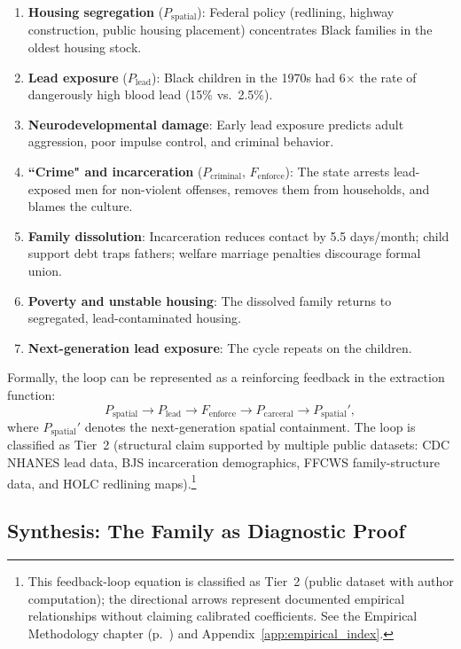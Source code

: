 \begin{enumerate}
  \item \textbf{Housing segregation} ($P_{\text{spatial}}$): Federal policy (redlining, highway construction, public housing placement) concentrates Black families in the oldest housing stock.
  \item \textbf{Lead exposure} ($P_{\text{lead}}$): Black children in the 1970s had 6$\times$ the rate of dangerously high blood lead (15\% vs.~2.5\%).
  \item \textbf{Neurodevelopmental damage}: Early lead exposure predicts adult aggression, poor impulse control, and criminal behavior.
  \item \textbf{``Crime" and incarceration} ($P_{\text{criminal}}$, $F_{\text{enforce}}$): The state arrests lead-exposed men for non-violent offenses, removes them from households, and blames the culture.
  \item \textbf{Family dissolution}: Incarceration reduces contact by 5.5 days/month; child support debt traps fathers; welfare marriage penalties discourage formal union.
  \item \textbf{Poverty and unstable housing}: The dissolved family returns to segregated, lead-contaminated housing.
  \item \textbf{Next-generation lead exposure}: The cycle repeats on the children.
\end{enumerate}

Formally, the loop can be represented as a reinforcing feedback in the extraction function:
\begin{equation}\label{eq:10.X-family-feedback-loop}
P_{\text{spatial}} \rightarrow P_{\text{lead}} \rightarrow F_{\text{enforce}} \rightarrow P_{\text{carceral}} \rightarrow P_{\text{spatial}}',
\end{equation}
where $P_{\text{spatial}}'$ denotes the next-generation spatial containment. The loop is classified as Tier~2 (structural claim supported by multiple public datasets: CDC NHANES lead data, BJS incarceration demographics, FFCWS family-structure data, and HOLC redlining maps).\footnote{This feedback-loop equation is classified as Tier~2 (public dataset with author computation); the directional arrows represent documented empirical relationships without claiming calibrated coefficients. See the Empirical Methodology chapter (p.~\pageref{ch:empirical_methodology}) and Appendix~\ref{app:empirical_index}.}

\subsection{Synthesis: The Family as Diagnostic Proof}

